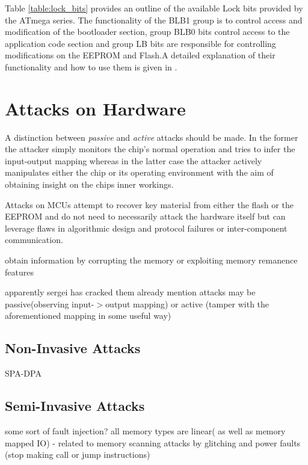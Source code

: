 \documentclass[10pt,a4paper,twocolumn]{article}
\begin{document}
Table \ref{table:lock_bits}	 provides an outline of the available Lock bits provided by the ATmega series. The functionality of the BLB1 group is to control access and modification of the bootloader section, group BLB0 bits control access to the application code section and group LB bits are responsible for controlling modifications on the EEPROM and Flash.A detailed explanation of their functionality and how to use them is given in \citep{atmega_manual}.
	
\section{Attacks on Hardware}
\label{sec:curr_attacks}
A distinction between \emph{passive} and \emph{active} attacks should be made. In the former the attacker simply monitors the chip's normal operation and tries to infer the input-output mapping whereas in the latter case the attacker actively manipulates either the chip or its operating environment with the aim of obtaining insight on the chips inner workings. 

Attacks on MCUs attempt to recover key material from either the flash or the EEPROM and do not need to necessarily attack the hardware itself but can leverage flaws in algorithmic design and protocol failures or inter-component communication\citep{anderson:cautionary_note}\citep{kocher:DPA}.

obtain information by corrupting the memory or exploiting memory remanence features\citep{anderson:tamper_resistance}

		apparently sergei has cracked them already \cite{website:scorobogatov_breaking_copy_protection}
	mention attacks may be passive(observing input-$>$output mapping) or active (tamper with the aforementioned mapping in some useful way)
	\subsection{Non-Invasive Attacks}
	SPA-DPA
	\subsection{Semi-Invasive Attacks}
	some sort of fault injection?
		all memory types are linear( as well as memory mapped IO) - related to memory scanning attacks by glitching and power faults (stop making call or jump instructions)
\end{document}
